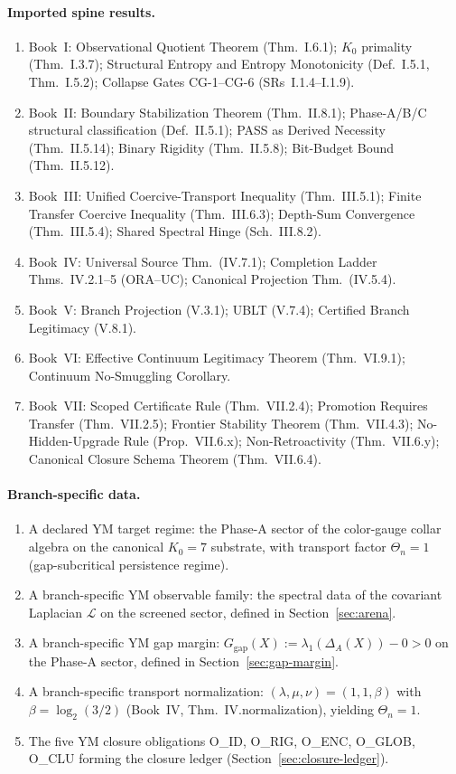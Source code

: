 \documentclass[12pt,oneside]{amsbook}
\theoremstyle{plain}
\theoremstyle{definition}
\theoremstyle{remark}
\begin{document}
\paragraph{Imported spine results.}
\begin{enumerate}[label=\textup{(\arabic*)}]
 \item Book~I: Observational Quotient Theorem (Thm.~I.6.1);
 $K_0$ primality (Thm.~I.3.7); Structural Entropy and
 Entropy Monotonicity (Def.~I.5.1, Thm.~I.5.2); Collapse
 Gates CG-1--CG-6 (SRs~I.1.4--I.1.9).
 \item Book~II: Boundary Stabilization Theorem (Thm.~II.8.1);
 Phase-A/B/C structural classification (Def.~II.5.1);
 PASS as Derived Necessity (Thm.~II.5.14); Binary Rigidity
 (Thm.~II.5.8); Bit-Budget Bound (Thm.~II.5.12).
 \item Book~III: Unified Coercive-Transport Inequality
 (Thm.~III.5.1); Finite Transfer Coercive Inequality
 (Thm.~III.6.3); Depth-Sum Convergence
 (Thm.~III.5.4);
 Shared Spectral Hinge (Sch.~III.8.2).
 \item Book~IV: Universal Source Thm.~(IV.7.1);
 Completion Ladder Thms.~IV.2.1--5 (ORA--UC);
 Canonical Projection Thm.~(IV.5.4).
 \item Book~V: Branch Projection (V.3.1); UBLT (V.7.4);
 Certified Branch Legitimacy (V.8.1).
 \item Book~VI: Effective Continuum Legitimacy Theorem
 (Thm.~VI.9.1); Continuum No-Smuggling Corollary.
 \item Book~VII: Scoped Certificate Rule (Thm.~VII.2.4);
 Promotion Requires Transfer (Thm.~VII.2.5); Frontier
 Stability Theorem (Thm.~VII.4.3); No-Hidden-Upgrade Rule
 (Prop.~VII.6.x); Non-Retroactivity (Thm.~VII.6.y);
 Canonical Closure Schema Theorem (Thm.~VII.6.4).
\end{enumerate}

\paragraph{Branch-specific data.}
\begin{enumerate}[label=\textup{(\arabic*)}]
 \item A declared YM target regime: the Phase-A sector of the
 color-gauge collar algebra on the canonical $K_0=7$
 substrate, with transport factor $\Theta_n = 1$
 (gap-subcritical persistence regime).
 \item A branch-specific YM observable family: the spectral data
 of the covariant Laplacian $\mathcal{L}$ on the screened
 sector, defined in Section~\ref{sec:arena}.
 \item A branch-specific YM gap margin: $G_{\mathrm{gap}}(X) :=
 \lambda_1(\Delta_A(X)) - 0 > 0$ on the Phase-A sector,
 defined in Section~\ref{sec:gap-margin}.
 \item A branch-specific transport normalization:
 $(\lambda,\mu,\nu) = (1,1,\beta)$ with
 $\beta = \log_2(3/2)$ (Book~IV, Thm.~IV.normalization),
 yielding $\Theta_n = 1$.
 \item The five YM closure obligations O\_ID, O\_RIG, O\_ENC,
 O\_GLOB, O\_CLU forming the closure ledger
 (Section~\ref{sec:closure-ledger}).
\end{enumerate}
\end{document}
